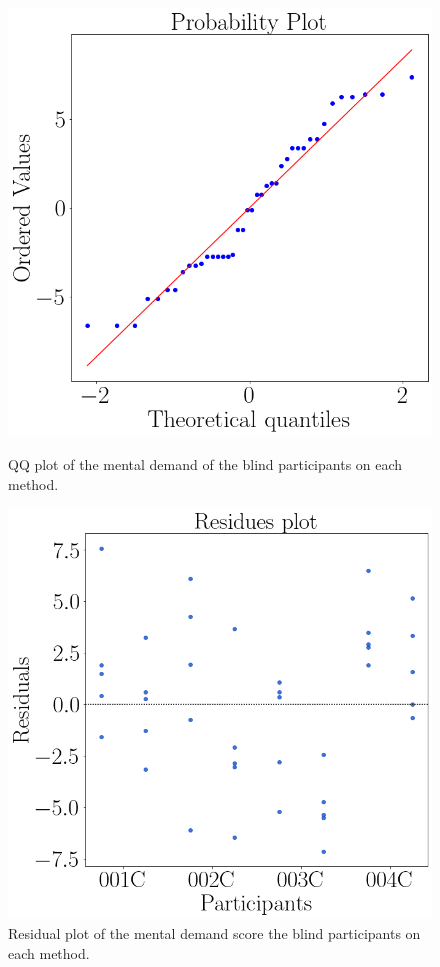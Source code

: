 \begin{figure}[!htb]
    \centering
    \begin{minipage}{0.45\textwidth}
        \centering
        \includegraphics[width = 0.8\linewidth]{Resultados/Nasa/Figuras/png/qqplot_md_avg_two_way_blind.png}
        \caption{QQ plot of the mental demand of the blind participants on each method.}
        \label{fig:qqplot_md_avg_two_way_blind}
    \end{minipage}
    \begin{minipage}{0.45\textwidth}
        \centering
        \includegraphics[width = 0.8\linewidth]{Resultados/Nasa/Figuras/png/residplot_md_avg_two_way_blind.png}
        \caption{Residual plot of the mental demand score the blind participants on each method.}
        \label{fig:residplot_md_avg_two_way_blind}
    \end{minipage}
\end{figure}

